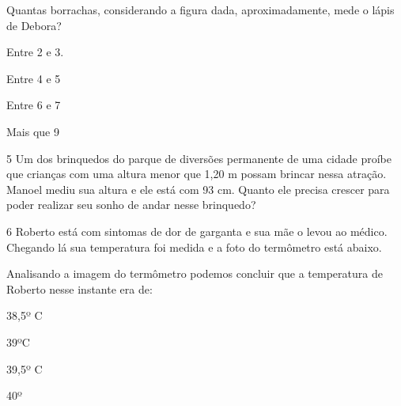 Quantas borrachas, considerando a figura dada, aproximadamente, mede o
lápis de Debora?

\begin{escolha}
\item
  Entre 2 e 3.
\item
  Entre 4 e 5
\item
  Entre 6 e 7
\item
  Mais que 9
\end{escolha}


\num{5} Um dos brinquedos do parque de diversões permanente de uma cidade
proíbe que crianças com uma altura menor que 1,20 m possam brincar nessa
atração. Manoel mediu sua altura e ele está com 93 cm. Quanto ele
precisa crescer para poder realizar seu sonho de andar nesse brinquedo?



\num{6} Roberto está com sintomas de dor de garganta e sua mãe o levou ao
médico. Chegando lá sua temperatura foi medida e a foto do termômetro
está abaixo.


Analisando a imagem do termômetro podemos concluir que a temperatura de
Roberto nesse instante era de:

\begin{escolha}
\item
  38,5º C
\item
  39ºC
\item
  39,5º C
\item
  40º
\end{escolha}


